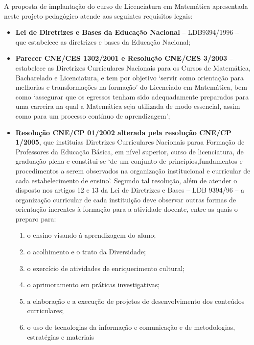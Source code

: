 A proposta de implantação do curso de Licenciatura em Matemática
apresentada neste projeto pedagógico atende aos seguintes requisitos
legais:

\begin{itemize}[label=-]
  \setlength{\itemsep}{0.2cm}
  \setlength{\parskip}{0.2cm}
  \setlength{\parsep}{0.2cm}
\item \textbf{Lei de Diretrizes e Bases da Educação Nacional} --
  LDB9394/1996 -- que estabelece as diretrizes e bases da Educação
  Nacional;
\item \textbf{Parecer CNE/CES 1302/2001 e Resolução CNE/CES 3/2003} --
  estabelece as Diretrizes Curriculares Nacionais para os Cursos de
  Matemática, Bacharelado e Licenciatura, e tem por objetivo `servir
  como orientação para melhorias e transformações na formação' do
  Licenciado em Matemática, bem como `assegurar que os egressos tenham
  sido adequadamente preparados para uma carreira na qual a Matemática
  seja utilizada de modo essencial, assim como para um processo
  contínuo de aprendizagem';
\item \textbf{Resolução CNE/CP 01/2002 alterada pela resolução CNE/CP
    1/2005}, que instituias Diretrizes Curriculares Nacionais paraa
  Formação de Professores da Educação Básica, em nível superior, curso
  de licenciatura, de graduação plena e constitui-se `de um conjunto
  de princípios,fundamentos e procedimentos a serem observados na
  organização institucional e curricular de cada estabelecimento de
  ensino'.  Segundo tal resolução, além de atender o disposto nos
  artigos 12 e 13 da Lei de Diretrizes e Bases -- LDB 9394/96 -- a
  organização curricular de cada instituição deve observar outras
  formas de orientação inerentes à formação para a atividade docente,
  entre as quais o preparo para:
  \begin{enumerate}[label=\roman*.]
  \item o ensino visando \`{a} aprendizagem do aluno;
  \item o acolhimento e o trato da Diversidade;
  \item o exerc\'{i}cio de atividades de enriquecimento cultural;
  \item o aprimoramento em pr\'{a}ticas investigativas;
  \item a elabora\c{c}\~{a}o e a execu\c{c}\~{a}o de projetos de
    desenvolvimento dos conte\'{u}dos curriculares;
  \item o uso de tecnologias da informa\c{c}\~{a}o e
    comunica\c{c}\~{a}o e de metodologias, estrat\'{e}gias e materiais

\end{enumerate}
\end{itemize}

